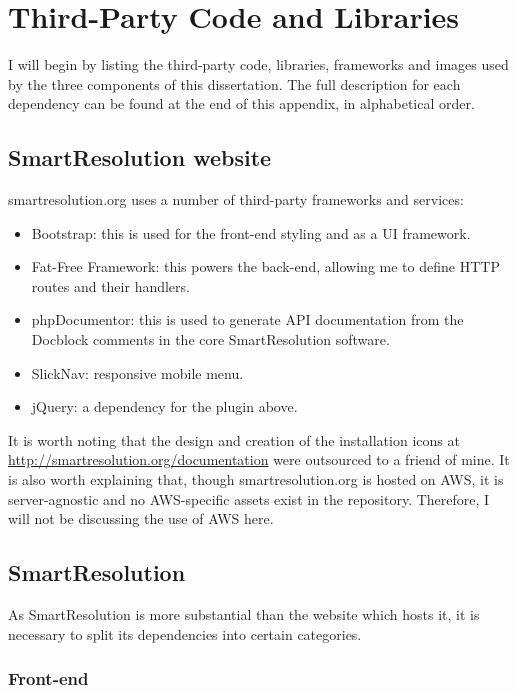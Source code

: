 \chapter{Third-Party Code and Libraries}

I will begin by listing the third-party code, libraries, frameworks and images used by the three components of this dissertation. The full description for each dependency can be found at the end of this appendix, in alphabetical order.

\section{SmartResolution website}

smartresolution.org uses a number of third-party frameworks and services:

\begin{itemize}
\item Bootstrap: this is used for the front-end styling and as a UI framework.
\item Fat-Free Framework: this powers the back-end, allowing me to define HTTP routes and their handlers.
\item phpDocumentor: this is used to generate API documentation from the Docblock comments in the core SmartResolution software.
\item SlickNav: responsive mobile menu.
\item jQuery: a dependency for the plugin above.
\end{itemize}

It is worth noting that the design and creation of the installation icons at \url{http://smartresolution.org/documentation} were outsourced to a friend of mine. It is also worth explaining that, though smartresolution.org is hosted on AWS, it is server-agnostic and no AWS-specific assets exist in the repository. Therefore, I will not be discussing the use of AWS here.

\section{SmartResolution}

As SmartResolution is more substantial than the website which hosts it, it is necessary to split its dependencies into certain categories.

\subsection{Front-end}

